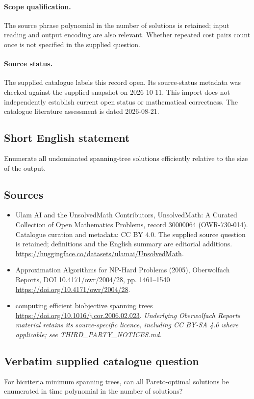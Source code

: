 \documentclass[11pt]{article}
\begin{document}
\paragraph{Scope qualification.}
The source phrase polynomial in the number of solutions is retained; input reading and output encoding are also relevant. Whether repeated cost pairs count once is not specified in the supplied question.
\paragraph{Source status.}
The supplied catalogue labels this record open. Its source-status metadata was checked against the supplied snapshot on 2026-10-11. This import does not independently establish current open status or mathematical correctness. The catalogue literature assessment is dated 2026-08-21.
\subsection{Short English statement}
Enumerate all undominated spanning-tree solutions efficiently relative to the size of the output.
\subsection{Sources}
\begin{itemize}
\item[S1] Ulam AI and the UnsolvedMath Contributors, UnsolvedMath: A Curated Collection of Open Mathematics Problems, record 30000064 (OWR-730-014). Catalogue curation and metadata: CC BY 4.0. The supplied source question is retained; definitions and the English summary are editorial additions.
\url{https://huggingface.co/datasets/ulamai/UnsolvedMath}.
\item[S2] Approximation Algorithms for NP-Hard Problems (2005), Oberwolfach Reports, DOI 10.4171/owr/2004/28, pp. 1461--1540
\url{https://doi.org/10.4171/owr/2004/28}.
\item[S3] computing efficient biobjective spanning trees
\url{https://doi.org/10.1016/j.cor.2006.02.023}.
\textit{Underlying Oberwolfach Reports material retains its source-specific licence, including CC BY-SA 4.0 where applicable; see THIRD\_PARTY\_NOTICES.md.}
\end{itemize}
\subsection{Verbatim supplied catalogue question}
For bicriteria minimum spanning trees, can all Pareto-optimal solutions be enumerated in time polynomial in the number of solutions?
\end{document}
